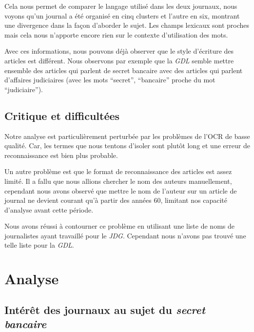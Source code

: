 \documentclass[11pt]{article}
\begin{document}
Cela nous permet de comparer le langage utilisé dans les deux journaux,
nous voyons qu'un journal a été organisé en cinq clusters et l'autre en
six, montrant une divergence dans la façon d'aborder le sujet. Les
champs lexicaux sont proches mais cela nous n'apporte encore rien sur le
contexte d'utilisation des mots.

Avec ces informations, nous pouvons déjà observer que le style
d'écriture des articles est différent. Nous observons par exemple que la
\emph{GDL} semble mettre ensemble des articles qui parlent de secret
bancaire avec des articles qui parlent d'affaires judiciaires (avec les
mots ``secret'', ``bancaire'' proche du mot ``judiciaire'').

\hypertarget{critique-et-difficultuxe9es}{%
\subsection{Critique et
difficultées}\label{critique-et-difficultuxe9es}}

Notre analyse est particulièrement perturbée par les problèmes de l'OCR
de basse qualité. Car, les termes que nous tentons d'isoler sont plutôt
long et une erreur de reconnaissance est bien plus probable.

Un autre problème est que le format de reconnaissance des articles est
assez limité. Il a fallu que nous allions chercher le nom des auteurs
manuellement, cependant nous avons observé que mettre le nom de l'auteur
sur un article de journal ne devient courant qu'à partir des années 60,
limitant nos capacité d'analyse avant cette période.

Nous avons réussi à contourner ce problème en utilisant une liste de
noms de journalistes ayant travaillé pour le \emph{JDG}. Cependant nous
n'avons pas trouvé une telle liste pour la \emph{GDL}.


\hypertarget{analyse}{%
\section{Analyse}\label{analyse}}

\hypertarget{intuxe9ruxeat-des-journaux-au-sujet-du-secret-bancaire}{%
\subsection{\texorpdfstring{Intérêt des journaux au sujet du
\emph{secret
bancaire}}{Intérêt des journaux au sujet du secret bancaire}}\label{intuxe9ruxeat-des-journaux-au-sujet-du-secret-bancaire}}
\end{document}
